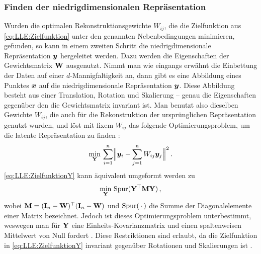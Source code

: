 \subsubsection{Finden der niedrigdimensionalen Repräsentation}
\label{ch:MethodenDerDimRed:statistisch:LLE:FindenDerRepr}
Wurden die optimalen Rekonstruktionsgewichte $W_{ij}$, die die Zielfunktion aus
\eqref{eq:LLE:Zielfunktion} unter den genannten Nebenbedingungen minimieren, gefunden, so kann in einem zweiten Schritt die niedrigdimensionale Repräsentation $\bm{y}$ hergeleitet werden. Dazu werden die Eigenschaften der Gewichtsmatrix $\mathbf{W}$ ausgenutzt. Nimmt man wie eingangs erwähnt die Einbettung der Daten auf einer $d$-Mannigfaltigkeit an, dann gibt es eine Abbildung eines Punktes $\bm{x}$ auf die niedrigdimensionale Repräsentation $\bm{y}$. Diese Abbildung besteht aus einer Translation, Rotation und Skalierung -- genau die Eigenschaften gegenüber den die Gewichtsmatrix invariant ist. Man benutzt also dieselben Gewichte $W_{ij}$, die auch für die Rekonstruktion der ursprünglichen Repräsentation genutzt wurden, und löst mit fixem $W_{ij}$ das folgende Optimierungsproblem, um die latente Repräsentation zu finden \parencite[2324]{Roweis.2000}:
\begin{equation}
	\label{eq:LLE:ZielfunktionY}
	\min_{\mat{Y}}\, \sum_{i = 1}^n \norm[\Big]{\vect{y}_i - \sum_{j = 1}^n W_{ij}\vect{y}_j}^2 \, .
\end{equation}
\eqref{eq:LLE:ZielfunktionY} kann äquivalent umgeformt werden zu \parencite[4]{Ghojogh.2020}
\begin{equation}
	\min_{\mathbf{Y}}\, \operatorname{Spur}(\mathbf{Y}^\top \mathbf{M} \mathbf{Y}) \, ,
\end{equation}
wobei $\mathbf{M} = (\mathbf{I}_n - \mathbf{W})^\top (\mathbf{I}_n - \mathbf{W})$ und $\operatorname{Spur}(\,\cdot\,)$ die Summe der Diagonalelemente einer Matrix bezeichnet. Jedoch ist dieses Optimierungsproblem unterbestimmt, weswegen man für $\mathbf{Y}$ eine Einheits-Kovarianzmatrix und einen spaltenweisen Mittelwert von Null fordert \parencite[11]{Saul.2000}. Diese Restriktionen sind erlaubt, da die Zielfunktion in
\eqref{eq:LLE:ZielfunktionY} invariant gegenüber Rotationen und Skalierungen ist \parencite[2326]{Roweis.2000}.

